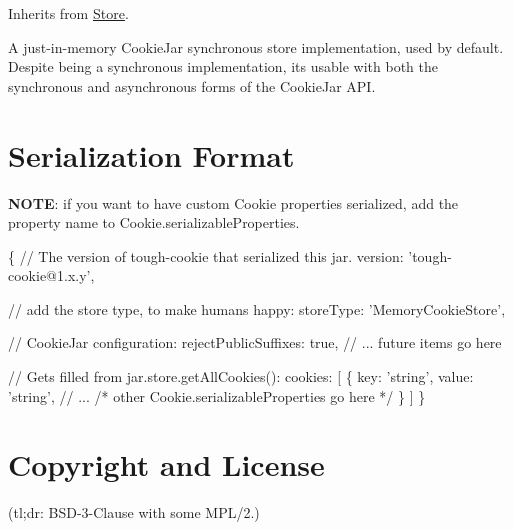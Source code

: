 Inherits from {\ttfamily \hyperlink{class_store}{Store}}.

A just-\/in-\/memory Cookie\+Jar synchronous store implementation, used by default. Despite being a synchronous implementation, it\textquotesingle{}s usable with both the synchronous and asynchronous forms of the {\ttfamily Cookie\+Jar} A\+P\+I.

\section*{Serialization Format}

{\bfseries N\+O\+T\+E}\+: if you want to have custom {\ttfamily Cookie} properties serialized, add the property name to {\ttfamily Cookie.\+serializable\+Properties}.


\begin{DoxyCode}
\{
  \textcolor{comment}{// The version of tough-cookie that serialized this jar.}
  version: \textcolor{stringliteral}{'tough-cookie@1.x.y'},

  \textcolor{comment}{// add the store type, to make humans happy:}
  storeType: \textcolor{stringliteral}{'MemoryCookieStore'},

  \textcolor{comment}{// CookieJar configuration:}
  rejectPublicSuffixes: \textcolor{keyword}{true},
  \textcolor{comment}{// ... future items go here}

  \textcolor{comment}{// Gets filled from jar.store.getAllCookies():}
  cookies: [
    \{
      key: \textcolor{stringliteral}{'string'},
      value: \textcolor{stringliteral}{'string'},
      \textcolor{comment}{// ...}
      \textcolor{comment}{/* other Cookie.serializableProperties go here */}
    \}
  ]
\}
\end{DoxyCode}


\section*{Copyright and License}

(tl;dr\+: B\+S\+D-\/3-\/\+Clause with some M\+P\+L/2.)



